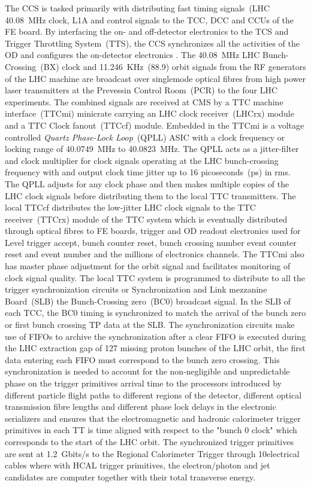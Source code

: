 \par 
The CCS is tasked primarily with distributing fast timing signals~(LHC 40.08~MHz clock, L1A  and control signals to the TCC, DCC and CCUs of the FE board. By interfacing the on- and off-detector electronics to the TCS and Trigger Throttling System~(TTS), the CCS synchronizes all the activities of the OD and configures the on-detector electronics \cite{ECALREADOUT}.  
\newline
The 40.08~MHz LHC Bunch-Crossing~(BX) clock and 11.246~KHz~(88.9\mus) orbit signals from the RF generators of the LHC machine are broadcast over singlemode optical fibres from high power laser transmitters at the Prevessin Control Room~(PCR) to the four LHC experiments. The combined signals  are received at CMS by a TTC machine interface~(TTCmi) minicrate carrying an LHC clock receiver~(LHCrx) module and a TTC Clock fanout~(TTCcf) module. Embedded in the TTCmi is a voltage controlled \textit{Quartz Phase-Lock Loop}~(QPLL) ASIC with a clock frequency or locking range of 40.0749~MHz to 40.0823~MHz. The QPLL acts as a jitter-filter and clock multiplier for clock signals operating at the LHC bunch-crossing frequency with and output clock time jitter up to 16 picoseconds~(ps) in rms. The QPLL adjusts for any clock phase and then makes multiple copies of the LHC clock signals before distributing them to the local TTC transmitters. The local TTCcf distributes the low-jitter LHC clock signals to the TTC receiver~(TTCrx) module of the TTC system which is eventually distributed through optical fibres to FE boards, trigger and OD readout electronics used for Level trigger accept, bunch counter reset, bunch crossing number event counter reset and event number and the millions of electronics channels. The TTCmi also has master phase adjustment for the  orbit signal and facilitates monitoring of clock signal quality. The local TTC system is programmed to distribute to all the trigger synchronization circuits or Synchronization and Link mezzanine Board~(SLB) the  Bunch-Crossing zero~(BC0) broadcast signal. 
\newline
In the SLB of each TCC, the BC0 timing is synchronized \cite{TRIGSYNC} to match the arrival of the bunch zero or first bunch crossing TP data at the SLB. The synchronization circuits make use of FIFOs to archive the synchronization \ie after a clear FIFO is executed during the LHC extraction gap of 127 missing proton bunches of the LHC orbit, the first data entering each FIFO must correspond to the bunch zero crossing. This synchronization is needed to account for the non-negligible and unpredictable phase on the trigger primitives arrival time to the processors introduced by different particle flight paths to different regions of the detector, different optical transmission fibre lengths and different phase lock delays in the electronic serializers and ensures that the electromagnetic and hadronic calorimeter trigger primitives in each TT is time aligned with respect to the "bunch 0 clock" which corresponds to the start of the LHC orbit. The synchronized trigger primitives are sent at 1.2~Gbits/s to the Regional Calorimeter Trigger through 10\m electrical cables where with HCAL trigger primitives, the electron/photon and jet candidates are computer together with their total transverse energy. 
